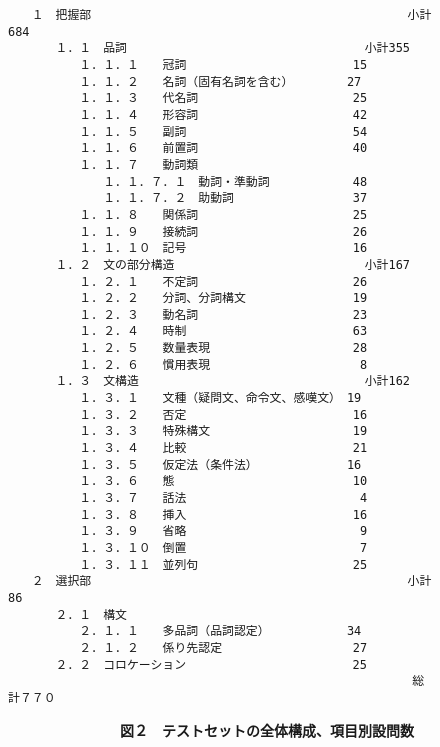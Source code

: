 \begin{figure}
\begin{small}
\begin{verbatim}
　　１　把握部　　　　　　　　　　　　　　　　　　　　　　　　　　 小計684
　　　　１．１　品詞　　　　　　　　　　　　　　　　　　　　小計355
　　　　　　１．１．１　　冠詞　　　　　　　　　　　　　　15
　　　　　　１．１．２　　名詞（固有名詞を含む）　　　　　27
　　　　　　１．１．３　　代名詞　　　　　　　　　　　　　25
　　　　　　１．１．４　　形容詞　　　　　　　　　　　　　42
　　　　　　１．１．５　　副詞　　　　　　　　　　　　　　54
　　　　　　１．１．６　　前置詞　　　　　　　　　　　　　40
　　　　　　１．１．７　　動詞類　　　　　
　　　　　　　　１．１．７．１　動詞・準動詞　　　　　　　48
　　　　　　　　１．１．７．２　助動詞　　　　　　　　　　37
　　　　　　１．１．８　　関係詞　　　　　　　　　　　　　25
　　　　　　１．１．９　　接続詞　　　　　　　　　　　　　26
　　　　　　１．１．１０　記号　　　　　　　　　　　　　　16
　　　　１．２　文の部分構造　　　　　　　　　　　　　　　　小計167
　　　　　　１．２．１　　不定詞　　　　　　　　　　　　　26
　　　　　　１．２．２　　分詞、分詞構文　　　　　　　　　19
　　　　　　１．２．３　　動名詞　　　　　　　　　　　　　23
　　　　　　１．２．４　　時制　　　　　　　　　　　　　　63
　　　　　　１．２．５　　数量表現　　　　　　　　　　　　28
　　　　　　１．２．６　　慣用表現　　　　　　　　　　　　 8
　　　　１．３　文構造　　　　　　　　　　　　　　　　　　　小計162
　　　　　　１．３．１　　文種（疑問文、命令文、感嘆文）　19
　　　　　　１．３．２　　否定　　　　　　　　　　　　　　16
　　　　　　１．３．３　　特殊構文　　　　　　　　　　　　19
　　　　　　１．３．４　　比較　　　　　　　　　　　　　　21
　　　　　　１．３．５　　仮定法（条件法）　　　　　　　　16
　　　　　　１．３．６　　態　　　　　　　　　　　　　　　10
　　　　　　１．３．７　　話法　　　　　　　　　　　　　　 4
　　　　　　１．３．８　　挿入　　　　　　　　　　　　　　16
　　　　　　１．３．９　　省略　　　　　　　　　　　　　　 9
　　　　　　１．３．１０　倒置　　　　　　　　　　　　　　 7
　　　　　　１．３．１１　並列句　　　　　　　　　　　　　25
　　２　選択部　　　　　　　　　　　　　　　　　　　　　　　　　　 小計 86
　　　　２．１　構文
　　　　　　２．１．１　　多品詞（品詞認定）　　　　　　　34
　　　　　　２．１．２　　係り先認定　　　　　　　　　　　27
　　　　２．２　コロケーション　　　　　　　　　　　　　　25
　　　　　　　　　　　　　　　　　　　　　　　　　　　　　　　　　　総計７７０

\end{verbatim}
\end{small}
{\bf　　　　　　　　図２　テストセットの全体構成、項目別設問数}

\end{figure}



